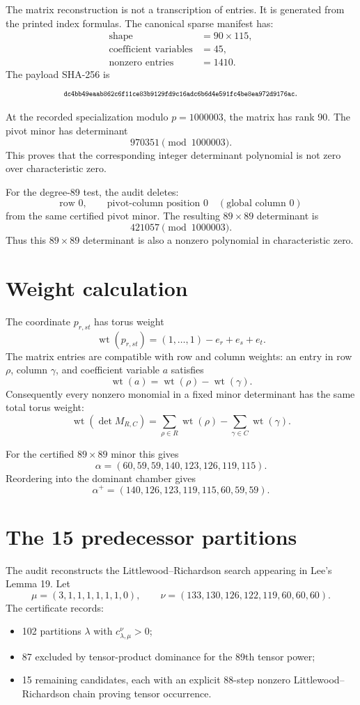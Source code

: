\documentclass[11pt]{article}
\newcommand{\wt}{\operatorname{wt}}
\begin{document}
The matrix reconstruction is not a transcription of entries.  It is generated
from the printed index formulas.  The canonical sparse manifest has:
\[
\begin{array}{rl}
\text{shape} &= 90\times115,\\
\text{coefficient variables} &= 45,\\
\text{nonzero entries} &= 1410.
\end{array}
\]
The payload SHA-256 is
\[
\text{\scriptsize\ttfamily dc4bb49eaab862c6f11ce83b9129fd9c16adc6b6d4e591fc4be8ea972d9176ac}.
\]

At the recorded specialization modulo \(p=1000003\), the matrix has rank 90.
The pivot minor has determinant
\[
  970351 \pmod {1000003}.
\]
This proves that the corresponding integer determinant polynomial is not zero
over characteristic zero.

For the degree-89 test, the audit deletes:
\[
 \text{row }0,\qquad \text{pivot-column position }0
 \quad(\text{global column }0)
\]
from the same certified pivot minor.  The resulting \(89\times89\) determinant
is
\[
  421057 \pmod {1000003}.
\]
Thus this \(89\times89\) determinant is also a nonzero polynomial in
characteristic zero.

\section{Weight calculation}

The coordinate \(p_{r,st}\) has torus weight
\[
 \wt(p_{r,st})=(1,\ldots,1)-e_r+e_s+e_t.
\]
The matrix entries are compatible with row and column weights: an entry in row
\(\rho\), column \(\gamma\), and coefficient variable \(a\) satisfies
\[
 \wt(a)=\wt(\rho)-\wt(\gamma).
\]
Consequently every nonzero monomial in a fixed minor determinant has the same
total torus weight:
\[
 \wt(\det M_{R,C})
 =
 \sum_{\rho\in R}\wt(\rho)-\sum_{\gamma\in C}\wt(\gamma).
\]

For the certified \(89\times89\) minor this gives
\[
\alpha=(60,59,59,140,123,126,119,115).
\]
Reordering into the dominant chamber gives
\[
\alpha^+=(140,126,123,119,115,60,59,59).
\]

\section{The 15 predecessor partitions}

The audit reconstructs the Littlewood--Richardson search appearing in Lee's
Lemma 19.  Let
\[
\mu=(3,1,1,1,1,1,1,0),\qquad
\nu=(133,130,126,122,119,60,60,60).
\]
The certificate records:
\begin{itemize}
  \item 102 partitions \(\lambda\) with \(c^\nu_{\lambda,\mu}>0\);
  \item 87 excluded by tensor-product dominance for the 89th tensor power;
  \item 15 remaining candidates, each with an explicit 88-step nonzero
  Littlewood--Richardson chain proving tensor occurrence.
\end{itemize}
\end{document}
